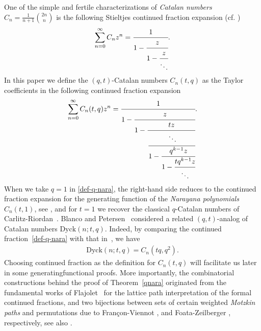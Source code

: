 \documentclass[12pt,reqno]{amsart}
\numberwithin{equation}{section}
\theoremstyle{plain}
\theoremstyle{definition}
\def\area{\mathsf{area}}
\def\Dyck{\text{Dyck}}
\def\rank{\mathsf{rank}}
\begin{document}
One of the simple and fertile characterizations of \emph{Catalan numbers} $C_n=\frac{1}{n+1}{2n\choose n}$ is  the following Stieltjes continued fraction expansion (cf. \cite{BCS08,Fl80})
\begin{align*}
\sum_{n=0}^\infty C_n z^n=
\cfrac{1}{
1-\cfrac{z}{1-\cfrac{z}{
\ddots}}}.
\end{align*}
 In this paper we
define  the  $(q,t)$-Catalan  numbers $C_n(t,q)$ as the Taylor coefficients in the following continued fraction expansion
\begin{equation}\label{def-q-nara}
\sum_{n=0}^\infty C_n(t,q) z^n=
\cfrac{1}{
1-\cfrac{z}{1-\cfrac{tz}{
\cfrac{\ddots}{1-\cfrac{q^{k-1}z}{1-\cfrac{tq^{k-1}z}{\ddots}
}}}}}.
\end{equation}
When we take $q=1$ in \eqref{def-q-nara}, the right-hand side reduces to the continued fraction expansion for the generating function of the \emph{Narayana polynomials} $C_n(t,1)$, see \cite{BCS08}, and for $t=1$ we recover the classical $q$-Catalan numbers of Carlitz-Riordan~\cite{CR64}. Blanco and Petersen~\cite{BP14} considered a related $(q,t)$-analog of Catalan numbers $\Dyck(n; t,q)$.
Indeed, by comparing the continued fraction~\eqref{def-q-nara} with that in~\cite[Proposition~2.6]{BP14},  we have
 \begin{align}\label{comb2-q-nara}
\Dyck(n; t,q)=C_n(tq,q^2).
\end{align}
Choosing continued fraction as the definition for $C_n(t,q)$ will facilitate us later in some generatingfunctional proofs. More importantly, the combinatorial constructions behind the proof of Theorem~\ref{qnara} originated from the fundamental works of Flajolet~\cite{Fl80} for the lattice path interpretation of the formal continued fractions, and two bijections between sets of certain weighted  \emph{Motzkin paths} and permutations  due to Fran\c con-Viennot \cite{FV}, and Foata-Zeilberger \cite{FZ}, respectively, see also \cite{CSZ, SZ10, SZ12}.
\end{document}
